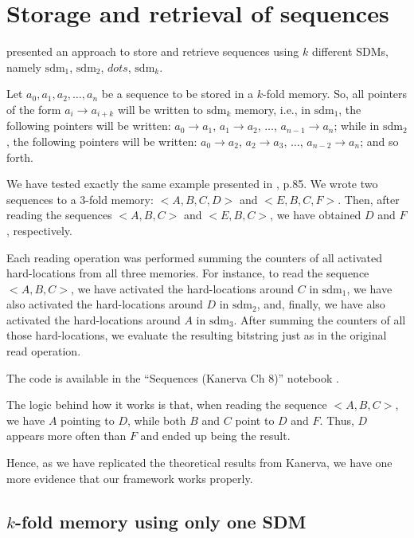 \section{Storage and retrieval of sequences}

\citet[Ch.8]{Kanerva1988} presented an approach to store and retrieve sequences using $k$ different SDMs, namely $\text{sdm}_1$, $\text{sdm}_2$, $dots$, $\text{sdm}_k$.

Let $a_0, a_1, a_2, \dots, a_n$ be a sequence to be stored in a $k$-fold memory. So, all pointers of the form $a_i \rightarrow a_{i+k}$ will be written to $\text{sdm}_k$ memory, i.e., in $\text{sdm}_1$, the following pointers will be written: $a_0 \rightarrow a_1$, $a_1 \rightarrow a_2$, $\dots$, $a_{n-1} \rightarrow a_n$; while in $\text{sdm}_2$, the following pointers will be written: $a_0 \rightarrow a_2$, $a_2 \rightarrow a_3$, $\dots$, $a_{n-2} \rightarrow a_n$; and so forth.

We have tested exactly the same example presented in \citet{Kanerva1988}, p.85. We wrote two sequences to a $3$-fold memory: $<A, B, C, D>$ and $<E, B, C, F>$. Then, after reading the sequences $<A, B, C>$ and $<E, B, C>$, we have obtained $D$ and $F$, respectively.

Each reading operation was performed summing the counters of all activated hard-locations from all three memories. For instance, to read the sequence $<A, B, C>$, we have activated the hard-locations around $C$ in $\text{sdm}_1$, we have also activated the hard-locations around $D$ in $\text{sdm}_2$, and, finally, we have also activated the hard-locations around $A$ in $\text{sdm}_3$. After summing the counters of all those hard-locations, we evaluate the resulting bitstring just as in the original read operation.

The code is available in the ``Sequences (Kanerva Ch 8)'' notebook \citep{sdmframework}.

The logic behind how it works is that, when reading the sequence $<A, B, C>$, we have $A$ pointing to $D$, while both $B$ and $C$ point to $D$ and $F$. Thus, $D$ appears more often than $F$ and ended up being the result.

Hence, as we have replicated the theoretical results from Kanerva, we have one more evidence that our framework works properly.

\subsection{$k$-fold memory using only one SDM}

